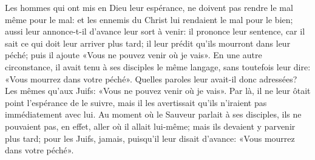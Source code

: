 Les hommes qui ont mis en Dieu leur espérance,
	ne doivent pas rendre le mal même pour le mal:
	et les ennemis du Christ lui rendaient le mal pour le bien;
	aussi leur annonce-t-il d’avance leur sort à venir:
	il prononce leur sentence, car il sait ce qui doit leur arriver plus tard;
	il leur prédit qu’ils mourront dans leur péché;
	puis il ajoute «Vous ne pouvez venir où je vais».
En une autre circonstance, il avait tenu à ses disciples le même langage,
	sans toutefois leur dire: «Vous mourrez dans votre péché».
Quelles paroles leur avait-il donc adressées?
Les mêmes qu’aux Juifs: «Vous ne pouvez venir où je vais».
Par là, il ne leur ôtait point l’espérance de le suivre,
	mais il les avertissait qu’ils n’iraient pas immédiatement avec lui.
Au moment où le Sauveur parlait à ses disciples,
	ils ne pouvaient pas, en effet, aller où il allait lui-même;
	mais ils devaient y parvenir plus tard;
	pour les Juifs, jamais, puisqu’il leur disait d’avance:
	«Vous mourrez dans votre péché».
